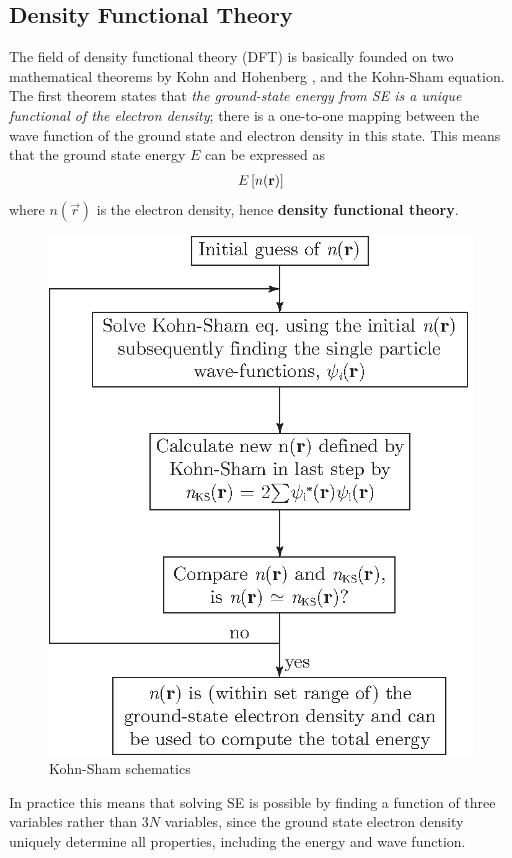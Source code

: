 {%
\subsection{Density Functional Theory}

The field of density functional theory (DFT) is basically founded on two mathematical theorems by Kohn and Hohenberg \citep{Hohenberg1964}, and the Kohn-Sham equation\citep{Kohn1965}. The first theorem states that \textit{the ground-state energy from SE is a unique functional of the electron density}; there is a one-to-one mapping between the wave function of the ground state and electron density in this state. This means that the ground state energy $E$ can be expressed as
\begin{align}
E\left[ n(\textbf{r}) \right]
\end{align}
where $n(\vec{r})$ is the electron density, hence \textbf{density functional theory}.
	\begin{figure}
		\centering
		\includegraphics[scale=1]{Figures/Kohn-Sham.eps}
		\caption{Kohn-Sham schematics}
		\label{fig:Kohn-Sham_selfconsistency}
	\end{figure}
In practice this means that solving SE is possible by finding a function of three variables rather than $3N$ variables, since the ground state electron density uniquely determine all properties, including the energy and wave function. 

}
